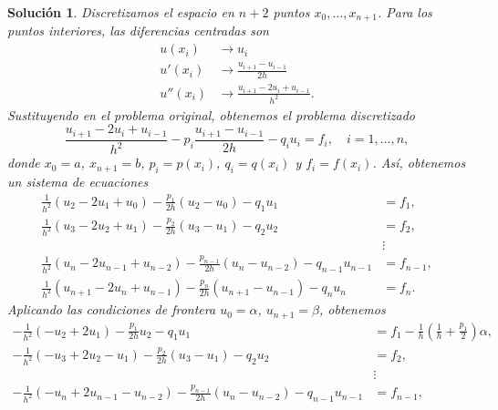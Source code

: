 \documentclass[11pt]{article}
\newtheorem*{sol}{Solución}
\begin{document}
\begin{sol}
  Discretizamos el espacio en $n+2$ puntos $x_0,\dots,x_{n+1}$. Para
  los puntos interiores, las diferencias centradas son
  \begin{align}
    u(x_i)
    &\to
    u_i
    \\
    u'(x_i)
    &\to
    \frac{u_{i+1}-u_{i-1}}{2h}
    \\
    u''(x_i)
    &\to
    \frac{u_{i+1}-2u_{i}+u_{i-1}}{h^{2}}
  .\end{align}
  Sustituyendo en el problema original, obtenemos
  el problema discretizado
  \begin{equation}
    \frac{u_{i+1}-2u_{i}+u_{i-1}}{h^{2}}
    - p_i
    \frac{u_{i+1}-u_{i-1}}{2h}
    - q_i
    u_i
    =
    f_i,
    \quad i=1,\dots,n
  ,\end{equation}
  donde $x_0=a$, $x_{n+1}=b$, $p_i=p(x_i)$, $q_i=q(x_i)$ y
  $f_i=f(x_i)$. Así, obtenemos un sistema de ecuaciones
  \begin{align}
      \frac{1}{h^{2}}(u_{2}-2u_{1}+u_{0})
      - 
      \frac{p_1}{2h}(u_{2}-u_{0})
      - q_1
      u_1
      &=
      f_1,
    \\
      \frac{1}{h^{2}}(u_{3}-2u_{2}+u_{1})
      - 
      \frac{p_2}{2h}(u_{3}-u_{1})
      - q_2
      u_2
      &=
      f_2,
    \\
      &\vdots \nonumber
    \\
      \frac{1}{h^{2}}(u_{n}-2u_{n-1}+u_{n-2})
      - 
      \frac{p_{n-1}}{2h}(u_{n}-u_{n-2})
      - q_{n-1}
      u_{n-1}
      &=
      f_{n-1},
    \\
      \frac{1}{h^{2}}(u_{n+1}-2u_{n}+u_{n-1})
      - 
      \frac{p_n}{2h}(u_{n+1}-u_{n-1})
      - q_n
      u_n
      &=
      f_n.
  \end{align}
  Aplicando las condiciones de frontera $u_0=\alpha$, $u_{n+1}=\beta$,
  obtenemos
  \begin{align}
      - \frac{1}{h^{2}}(-u_{2}+2u_{1})
      - \frac{p_1}{2h}u_{2}
      - q_1 u_1
      &=
      f_1 - \frac{1}{h}\left(\frac{1}{h} + \frac{p_1}{2}\right)\alpha,
    \\
      - \frac{1}{h^{2}}(-u_{3}+2u_{2}-u_{1})
      - \frac{p_2}{2h}(u_{3}-u_{1})
      - q_2 u_2
      &=
      f_2,
    \\
      &\vdots \nonumber
    \\
      - \frac{1}{h^{2}}(-u_{n}+2u_{n-1}-u_{n-2})
      - \frac{p_{n-1}}{2h}(u_{n}-u_{n-2})
      - q_{n-1} u_{n-1}
      &=
      f_{n-1},
    \\

\end{align}
\end{sol}
\end{document}
